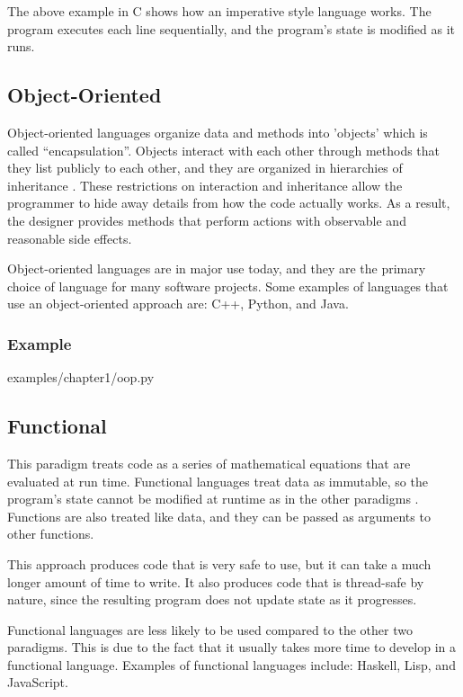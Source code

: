 \documentclass[12pt, oneside, a4paper]{book}
\begin{document}
         The above example in C shows how an imperative style language works.
         The program executes each line sequentially, and the program's state is modified as it runs.
         \subsection{Object-Oriented}
         Object-oriented languages organize data and methods into 'objects' which is called ``encapsulation''.
         Objects interact with each other through methods that they list publicly to each other, and they are organized in hierarchies of inheritance \autocite{normarkOverviewFourMain}.
         These restrictions on interaction and inheritance allow the programmer to hide away details from how the code actually works.
         As a result, the designer provides methods that perform actions with observable and reasonable side effects.

         Object-oriented languages are in major use today, and they are the primary choice of language for many software projects.
         Some examples of languages that use an object-oriented approach are: C++, Python, and Java.

         \subsubsection{Example}
         
         {examples/chapter1/oop.py}

         \subsection{Functional}
         This paradigm treats code as a series of mathematical equations that are evaluated at run time.
         Functional languages treat data as immutable, so the program's state cannot be modified at runtime as in the other paradigms \autocite{normarkOverviewFourMain}.
         Functions are also treated like data, and they can be passed as arguments to other functions.

         This approach produces code that is very safe to use, but it can take a much longer amount of time to write.
         It also produces code that is thread-safe by nature, since the resulting program does not update state as it progresses.

         Functional languages are less likely to be used compared to the other two paradigms.
         This is due to the fact that it usually takes more time to develop in a functional language.
         Examples of functional languages include: Haskell, Lisp, and JavaScript\footnotemark.
\end{document}
